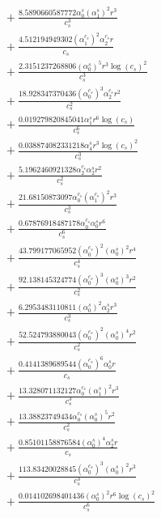\documentclass[10pt]{article}
\begin{document}
\begin{align*}
&{}  + \frac{8.5890660587772 \alpha_{0}^s \left(\alpha_{1}^s\right)^{2} r^{3}}{c_{s}^{3}} \\
&{}  + \frac{4.512194949302 \left(\alpha_{1}^{c_s}\right)^{2} \alpha_{2}^{c_s} r}{c_{s}} \\
&{}  + \frac{2.3151237268806 \left(\alpha_{0}^s\right)^{5} r^{3} \log{\left(c_{s} \right)}^{2}}{c_{s}^{3}} \\
&{}  + \frac{18.928347370436 \left(\alpha_{0}^{c_s}\right)^{3} \alpha_{2}^{c_s} r^{2}}{c_{s}^{2}} \\
&{}  + \frac{0.019279820845041 \alpha_{1}^s r^{6} \log{\left(c_{s} \right)}}{c_{s}^{6}} \\
&{}  + \frac{0.038874082331218 \alpha_{4}^s r^{3} \log{\left(c_{s} \right)}^{2}}{c_{s}^{3}} \\
&{}  + \frac{5.1962460921328 \alpha_{2}^{c_s} \alpha_{2}^s r^{2}}{c_{s}^{2}} \\
&{}  + \frac{21.68150873097 \alpha_{0}^{c_s} \left(\alpha_{1}^{c_s}\right)^{2} r^{3}}{c_{s}^{3}} \\
&{}  + \frac{0.67876918487178 \alpha_{0}^{c_s} \alpha_{0}^s r^{6}}{c_{s}^{6}} \\
&{}  + \frac{43.799177065952 \left(\alpha_{0}^{c_s}\right)^{2} \left(\alpha_{0}^s\right)^{2} r^{4}}{c_{s}^{4}} \\
&{}  + \frac{92.138145324774 \left(\alpha_{0}^{c_s}\right)^{3} \left(\alpha_{0}^s\right)^{3} r^{2}}{c_{s}^{2}} \\
&{}  + \frac{6.2953483110811 \left(\alpha_{0}^s\right)^{2} \alpha_{2}^s r^{3}}{c_{s}^{3}} \\
&{}  + \frac{52.524793880043 \left(\alpha_{0}^{c_s}\right)^{2} \left(\alpha_{0}^s\right)^{4} r^{2}}{c_{s}^{2}} \\
&{}  + \frac{0.4141389689544 \left(\alpha_{0}^{c_s}\right)^{6} \alpha_{0}^s r}{c_{s}} \\
&{}  + \frac{13.328071132127 \alpha_{0}^{c_s} \left(\alpha_{1}^s\right)^{2} r^{3}}{c_{s}^{3}} \\
&{}  + \frac{13.38823749434 \alpha_{0}^{c_s} \left(\alpha_{0}^s\right)^{5} r^{2}}{c_{s}^{2}} \\
&{}  + \frac{0.85101158876584 \left(\alpha_{0}^s\right)^{4} \alpha_{2}^s r}{c_{s}} \\
&{}  + \frac{113.83420028845 \left(\alpha_{0}^{c_s}\right)^{3} \left(\alpha_{0}^s\right)^{2} r^{3}}{c_{s}^{3}} \\
&{}  + \frac{0.014102698401436 \left(\alpha_{0}^s\right)^{2} r^{6} \log{\left(c_{s} \right)}^{2}}{c_{s}^{6}} \\

\end{align*}
\end{document}
